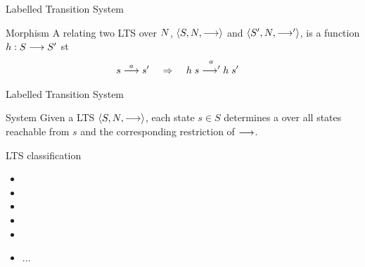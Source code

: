 \documentclass{beamer}
\begin{document}
\begin{slide}{Labelled Transition System}
\small
\begin{block}{Morphism}
A  relating two LTS over  $N$, $\mathopen{\langle}S,N, \longrightarrow\mathclose{\rangle}$ and $\mathopen{\langle}S',N,  \longrightarrow'\mathclose{\rangle}$,
is a function $h: S \longrightarrow S'$  st
\begin{align*}
s \stackrel{a}{\longrightarrow} s' \; \; \; \; \;  \mathbin{\Rightarrow} & \; \; \; \; \; h\; s  \stackrel{a}{\longrightarrow'} h\; s' 
\end{align*}
\end{block}

\begin{center}
\end{center}
\end{slide}

\begin{slide}{Labelled Transition System}
\small
\begin{block}{System}
Given a LTS $\mathopen{\langle}S, N, \longrightarrow\mathclose{\rangle}$, each state $s \in S$ determines a  over 
all states reachable from $s$ and the corresponding restriction of $\longrightarrow$.
\end{block}

\begin{block}{LTS classification}
\begin{itemize}
\item {}
\item {}
\item {}
\item {}
\item {}
\item ...
\end{itemize}
\end{block}

\end{slide}
\end{document}
